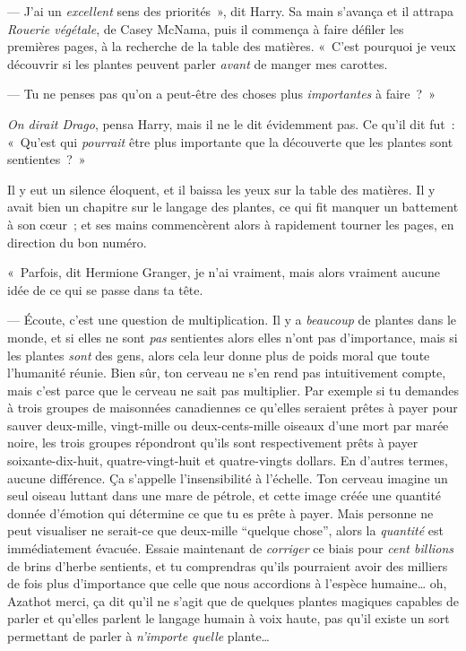 --- J'ai un \emph{excellent} sens des priorités~», dit Harry. Sa main s'avança et il attrapa \emph{Rouerie végétale}, de Casey McNama, puis il commença à faire défiler les premières pages, à la recherche de la table des matières. «~C'est pourquoi je veux découvrir si les plantes peuvent parler \emph{avant} de manger mes carottes.

--- Tu ne penses pas qu'on a peut-être des choses plus \emph{importantes} à faire~?~»

\emph{On dirait Drago}, pensa Harry, mais il ne le dit évidemment pas. Ce qu'il dit fut~: «~Qu'est qui \emph{pourrait} être plus importante que la découverte que les plantes sont sentientes~?~»

Il y eut un silence éloquent, et il baissa les yeux sur la table des matières. Il y avait bien un chapitre sur le langage des plantes, ce qui fit manquer un battement à son cœur~; et ses mains commencèrent alors à rapidement tourner les pages, en direction du bon numéro.

«~Parfois, dit Hermione Granger, je n'ai vraiment, mais alors vraiment aucune idée de ce qui se passe dans ta tête.

--- Écoute, c'est une question de multiplication. Il y a \emph{beaucoup} de plantes dans le monde, et si elles ne sont \emph{pas} sentientes alors elles n'ont pas d'importance, mais si les plantes \emph{sont} des gens, alors cela leur donne plus de poids moral que toute l'humanité réunie. Bien sûr, ton cerveau ne s'en rend pas intuitivement compte, mais c'est parce que le cerveau ne sait pas multiplier. Par exemple si tu demandes à trois groupes de maisonnées canadiennes ce qu'elles seraient prêtes à payer pour sauver deux-mille, vingt-mille ou deux-cents-mille oiseaux d'une mort par marée noire, les trois groupes répondront qu'ils sont respectivement prêts à payer soixante-dix-huit, quatre-vingt-huit et quatre-vingts dollars. En d'autres termes, aucune différence. Ça s'appelle l'insensibilité à l'échelle. Ton cerveau imagine un seul oiseau luttant dans une mare de pétrole, et cette image créée une quantité donnée d'émotion qui détermine ce que tu es prête à payer. Mais personne ne peut visualiser ne serait-ce que deux-mille “quelque chose”, alors la \emph{quantité} est immédiatement évacuée. Essaie maintenant de \emph{corriger} ce biais pour \emph{cent billions} de brins d'herbe sentients, et tu comprendras qu'ils pourraient avoir des milliers de fois plus d'importance que celle que nous accordions à l'espèce humaine… oh, Azathot merci, ça dit qu'il ne s'agit que de quelques plantes magiques capables de parler et qu'elles parlent le langage humain à voix haute, pas qu'il existe un sort permettant de parler à \emph{n'importe quelle} plante…

